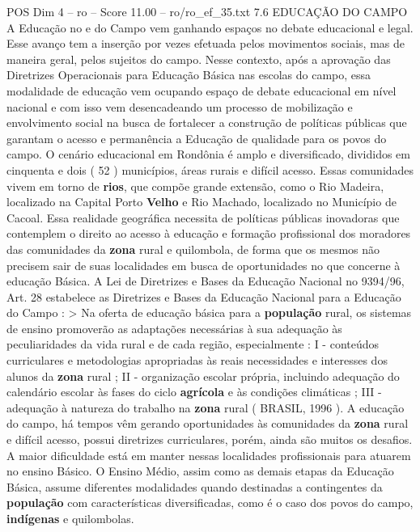 \begin{textsample}{POS Dim 4 – ro – Score 11.00 – ro/ro\_ef\_35.txt}  \label{ex:f4_pos_215}
7.6 EDUCAÇÃO DO CAMPO A Educação no e do Campo vem ganhando espaços no debate educacional e legal.
Esse avanço tem a inserção por vezes efetuada pelos movimentos sociais, mas de maneira geral, pelos sujeitos do campo.
Nesse contexto, após a aprovação das Diretrizes Operacionais para Educação Básica nas escolas do campo, essa modalidade de educação vem ocupando espaço de debate educacional em nível nacional e com isso vem desencadeando um processo de mobilização e envolvimento social na busca de fortalecer a construção de políticas públicas que garantam o acesso e permanência a Educação de qualidade para os povos do campo.
O cenário educacional em Rondônia é amplo e diversificado, divididos em cinquenta e dois ( 52 ) municípios, áreas rurais e difícil acesso.
Essas comunidades vivem em torno de \textbf{rios}, que compõe grande extensão, como o Rio Madeira, localizado na Capital Porto \textbf{Velho} e Rio Machado, localizado no Município de Cacoal.
Essa realidade geográfica necessita de políticas públicas inovadoras que contemplem o direito ao acesso à educação e formação profissional dos moradores das comunidades da \textbf{zona} rural e quilombola, de forma que os mesmos não precisem sair de suas localidades em busca de oportunidades no que concerne à educação Básica.
A Lei de Diretrizes e Bases da Educação Nacional no 9394/96, Art. 28 estabelece as Diretrizes e Bases da Educação Nacional para a Educação do Campo : > Na oferta de educação básica para a \textbf{população} rural, os sistemas de ensino promoverão as adaptações necessárias à sua adequação às peculiaridades da vida rural e de cada região, especialmente : I - conteúdos curriculares e metodologias apropriadas às reais necessidades e interesses dos alunos da \textbf{zona} rural ; II - organização escolar própria, incluindo adequação do calendário escolar às fases do ciclo \textbf{agrícola} e às condições climáticas ; III - adequação à natureza do trabalho na \textbf{zona} rural ( BRASIL, 1996 ).
A educação do campo, há tempos vêm gerando oportunidades às comunidades da \textbf{zona} rural e difícil acesso, possui diretrizes curriculares, porém, ainda são muitos os desafios.
A maior dificuldade está em manter nessas localidades profissionais para atuarem no ensino Básico.
O Ensino Médio, assim como as demais etapas da Educação Básica, assume diferentes modalidades quando destinadas a contingentes da \textbf{população} com características diversificadas, como é o caso dos povos do campo, \textbf{indígenas} e quilombolas.

\end{textsample}

